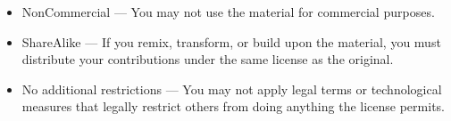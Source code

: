 {\begin{minipage}[b]{0.9\textwidth}
\begin{itemize}
    \item NonCommercial — You may not use the material for commercial purposes.

    \item ShareAlike — If you remix, transform, or build upon the material, you must distribute your contributions under the same license as the original.

    \item No additional restrictions — You may not apply legal terms or technological measures that legally restrict others from doing anything the license permits.
\end{itemize}
\end{minipage}
\vspace*{2\baselineskip}
\cleardoublepage
\rfoot{\thepage}}

\makeatletter
\g@addto@macro{\maketitle}{\secondpage}
\makeatother













\def\coverlogo{}
\def\copyrightnotes{}
\def\copyrightmention{}
\def\docuver{no-ver}
\def\prependtitle{}
\def\appendtitle{}
\def\coverfoot{}






